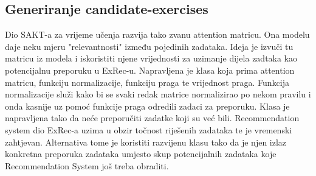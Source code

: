 		\subsection{Generiranje candidate-exercises}
		Dio SAKT-a za vrijeme učenja razvija tako zvanu attention matricu. Ona modelu daje neku mjeru "relevantnosti" između pojedinih zadataka. Ideja je izvuči tu matricu iz modela i iskoristiti njene vrijednosti za uzimanje dijela zadtaka kao potencijalnu preporuku u ExRec-u. Napravljena je klasa koja prima attention matricu, funkciju normalizacije, funkciju praga te vrijednost praga. Funkcija normalizacije služi kako bi se svaki redak matrice normalizirao po nekom pravilu i onda kasnije uz pomoć funkcije praga odredili zadaci za preporuku. Klasa je napravljena tako da neće preporučiti zadatke koji su već bili. Recommendation system dio ExRec-a uzima u obzir točnost riješenih zadataka te je vremenski zahtjevan. Alternativa tome je koristiti razvijenu klasu tako da je njen izlaz konkretna preporuka zadataka umjesto skup potencijalnih zadataka koje Recommendation System još treba obraditi.
		
